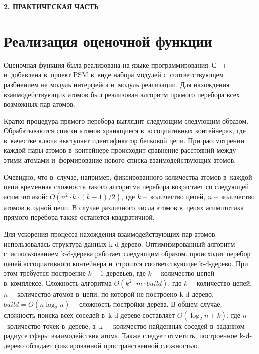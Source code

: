 \newpage
\begin{center}
	\textbf{\large 2. ПРАКТИЧЕСКАЯ ЧАСТЬ}
\end{center}


\section{Реализация оценочной функции}

Оценочная функция была реализована на языке программирования~С++ и~добавлена в~проект PSM в~виде набора модулей с~соответствующем разбиением на модуль интерфейса и~модуль реализации. Для нахождения взаимодействующих атомов был реализован алгоритм прямого перебора всех возможных пар атомов. 

Кратко процедура прямого перебора выглядит следующим следующим образом. Обрабатываются списки атомов хранящиеся в~ассоциативных контейнерах, где в~качестве ключа выступает идентификатор белковой цепи. При рассмотрении каждой пары атомов в~контейнере происходит сравнение расстояний между этими атомами и~формирование нового списка взаимодействующих атомов.

Очевидно, что в~случае, например, фиксированного количества атомов в~каждой цепи временная сложность такого алгоритма перебора возрастает со следующей асимптотикой: $O(n^2{\cdot}k{\cdot}(k-1)/2)$, где $k$ --~количество цепей, $n$ --~количество атомов в~одной цепи. В случае различного числа атомов в~цепях асимптотика прямого перебора также останется квадратичной.

Для ускорения процесса нахождения взаимодействующих пар атомов использовалась структура данных k-d-дерево. Оптимизированный алгоритм с~использованием k-d-дерева работает следующим образом. происходит перебор цепей ассоциативного контейнера и~строится соответствующее k-d-дерево. При этом требуется построение $k-1$ деревьев, где $k$ --~количество цепей в~комплексе. Сложность алгоритма $O(k^2 \cdot m \cdot build)$, где $k$ --~количество цепей, $n$ --~количество атомов в~цепи, по которой не построено k-d-дерево, $build = O(n \log_{2}{n})$ --~сложность постройки дерева. В общем случае, сложность поиска всех соседей в~k-d-дереве составляет $O(\log_{2}{n} + k)$, где $n$ --~количество точек в~дереве, а~k~--~количество найденных соседей в~заданном радиусе сферы взаимодействия атома. Также следует отметить, построенное k-d-дерево обладает фиксированной пространственной сложностью.

